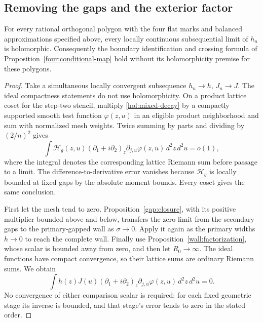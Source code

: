 \subsection{Removing the gaps and the exterior factor}

\begin{theorem}
\label{hol:disk}
For every rational orthogonal polygon with the four flat marks and
balanced approximations specified above, every locally continuous
subsequential limit of $h_n$ is holomorphic.  Consequently the boundary
identification and crossing formula of
Proposition~\ref{four:conditional-map} hold without its holomorphicity
premise for these polygons.
\end{theorem}

\begin{proof}
Take a simultaneous locally convergent subsequence $h_n\to h$,
$J_n\to J$.  The ideal compactness statements do not use holomorphicity.
On a product lattice coset for the step-two stencil, multiply
\eqref{hol:mixed-decay} by a compactly supported smooth test function
$\varphi(z,u)$ in an eligible product neighborhood and sum with
normalized mesh weights.  Twice summing by parts and dividing by
$(2/n)^2$ gives
\begin{equation}
 \int \mathcal H_g(z,u)
       (\partial_1+i\partial_2)_z\partial_{j,u}\varphi(z,u)
       \,d^2z\,d^2u=o(1),
 \label{hol:gapped-distribution}
\end{equation}
where the integral denotes the corresponding lattice Riemann sum
before passage to a limit.  The difference-to-derivative error vanishes
because $\mathcal H_g$ is locally bounded at fixed gaps by the absolute
moment bounds.  Every coset gives the same conclusion.

First let the mesh tend to zero.  Proposition~\ref{gap:closure}, with
its positive multiplier bounded above and below, transfers the zero
limit from the secondary gaps to the primary-gapped wall as
$\sigma\to0$.  Apply it again as the primary widths $h\to0$ to reach
the complete wall.  Finally use Proposition~\ref{wall:factorization},
whose scalar is bounded away from zero, and then let $R_0\to\infty$.
The ideal functions have compact convergence, so their lattice sums
are ordinary Riemann sums.  We obtain
\begin{equation}
 \int h(z)J(u)(\partial_1+i\partial_2)_z
             \partial_{j,u}\varphi(z,u)\,d^2z\,d^2u=0.
 \label{hol:product-distribution}
\end{equation}
No convergence of either comparison scalar is required: for each fixed
geometric stage its inverse is bounded, and that stage's error tends
to zero in the stated order.


\end{proof}
